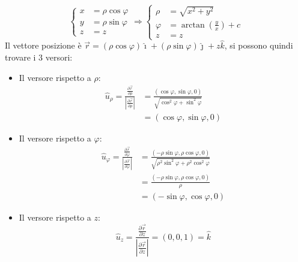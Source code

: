 \documentclass[11pt, a4paper, openright]{book}
\theoremstyle{plain}
\theoremstyle{definition}
\begin{document}
\[
\begin{cases}
    x & = \rho\cos\varphi \\
    y & = \rho\sin\varphi \\
    z & = z
\end{cases} \Rightarrow \begin{cases}
    \rho & = \sqrt{x^2 + y^2} \\
    \varphi & =  \arctan(\frac{y}{x}) + c\\
    z & = z
\end{cases}
\]
Il vettore posizione è $\vec{r} = (\rho\cos\varphi)\hat{\imath} + (\rho\sin\varphi)\hat{\jmath} + z\hat{k}$, si possono quindi trovare i 3 versori:
\begin{itemize}
    \item Il versore rispetto a $\rho$:
        \begin{align}
            \hat{u}_\rho = \frac{\frac{\partial \vec{r}}{\partial \rho}}{|\frac{\partial \vec{r}}{\partial \rho}|} & = \frac{(\cos\varphi, \sin\varphi, 0)}{\sqrt{\cos^2\varphi + \sin^2\varphi}} \\ 
            & = (\cos\varphi, \sin\varphi, 0)
        \end{align}
    \item Il versore rispetto a $\varphi$:
        \begin{align}
            \hat{u}_\varphi = \frac{\frac{\partial \vec{r}}{\partial \varphi}}{|\frac{\partial \vec{r}}{\partial \varphi}|} & = \frac{(-\rho\sin\varphi,\rho\cos\varphi, 0)}{\sqrt{\rho^2\sin^2\varphi + \rho^2\cos^2\varphi}} \\
            & = \frac{(-\rho\sin\varphi,\rho\cos\varphi, 0)}{\rho} \\ 
            & = (-\sin\varphi,\cos\varphi, 0)
        \end{align}
    \item Il versore rispetto a $z$:
        \[\hat{u}_z = \frac{\frac{\partial \vec{r}}{\partial z}}{|\frac{\partial \vec{r}}{\partial z}|} = (0, 0, 1) = \hat{k}\]
\end{itemize}
\end{document}
